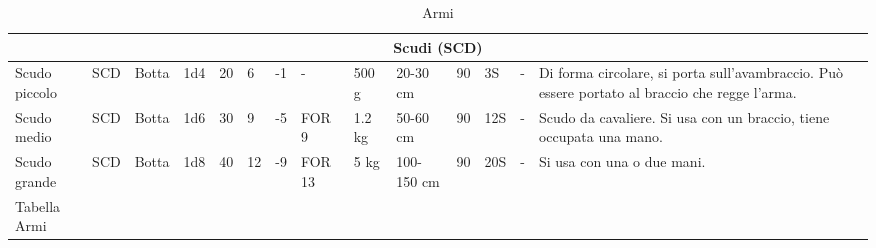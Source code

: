 {\begin{longtable}{|p{1.5cm}|p{0.7cm}|p{0.9cm}|p{0.9cm}|l|l|l|p{0.9cm}|p{0.8cm}|p{1.0cm}|l|l|p{0.75cm}|p{3.2cm}|}
  \hline\multicolumn{14}{|c|}{\normalsize\sc Scudi (SCD)}\tabularnewline \hline\hline
  \raggedright Scudo piccolo& \raggedright SCD& \raggedright Botta& \raggedright 1d4& \raggedright 20& \raggedright 6& \raggedright -1& \raggedright -& \raggedright 500 g& \raggedright 20-30 cm& \raggedright 90& \raggedright 3S& \raggedright -& \raggedright Di forma circolare, si porta sull'avambraccio. Pu\`o essere portato al braccio che regge l'arma.\tabularnewline \hline
  \raggedright Scudo medio& \raggedright SCD& \raggedright Botta& \raggedright 1d6& \raggedright 30& \raggedright 9& \raggedright -5& \raggedright FOR 9& \raggedright 1.2 kg& \raggedright 50-60 cm& \raggedright 90& \raggedright 12S& \raggedright -& \raggedright Scudo da cavaliere. Si usa con un braccio, tiene occupata una mano.\tabularnewline \hline
  \raggedright Scudo grande& \raggedright SCD& \raggedright Botta& \raggedright 1d8& \raggedright 40& \raggedright 12& \raggedright -9& \raggedright FOR 13& \raggedright 5 kg& \raggedright 100-150 cm& \raggedright 90& \raggedright 20S& \raggedright -& \raggedright Si usa con una o due mani.\tabularnewline \hline
  \caption{Armi}{Tabella Armi}\tabularnewline
\end{longtable}
}
  
